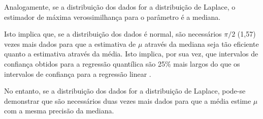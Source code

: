\documentclass[a4paper, 12pt]{article}
\begin{document}
Analogamente, se a distribuição dos dados for a distribuição de Laplace,
o estimador de máxima verossimilhança para o parâmetro é a mediana.

Isto implica que, se a distribuição dos dados é normal, são necessários
\(\pi/2\) (1,57) vezes mais dados para que a estimativa de \(\mu\)
através da mediana seja tão eficiente quanto a estimativa através da
média. Isto implica, por sua vez, que intervalos de confiança obtidos
para a regressão quantílica são 25\% mais largos do que os intervalos de
confiança para a regressão linear \autocites[
354]{koenker2000}[92]{dasGupta}.

No entanto, se a distribuição dos dados for a distribuição de Laplace,
pode-se demonstrar que são necessários duas vezes mais dados para que a
média estime \(\mu\) com a mesma precisão da mediana.
\end{document}
